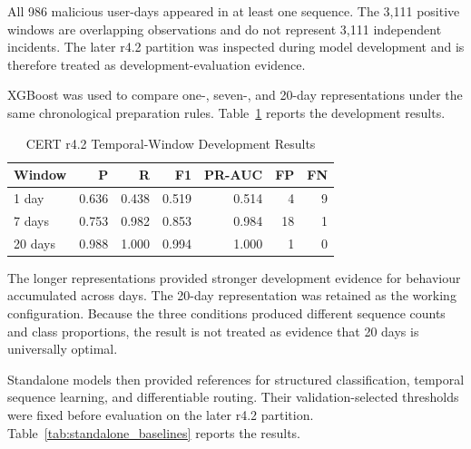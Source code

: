 All 986 malicious user-days appeared in at least one sequence. The 3,111
positive windows are overlapping observations and do not represent 3,111
independent incidents. The later r4.2 partition was inspected during model
development and is therefore treated as development-evaluation evidence.

\smallskip
XGBoost was used to compare one-, seven-, and 20-day representations under
the same chronological preparation rules.
Table~\ref{tab:temporal_window_comparison} reports the development results.

\begin{table}[!tbp]
\caption{CERT r4.2 Temporal-Window Development Results}
\label{tab:temporal_window_comparison}
\centering
\footnotesize
\renewcommand{\arraystretch}{1.08}
\setlength{\tabcolsep}{1.5pt}
\begin{tabular*}{\columnwidth}
{@{\extracolsep{\fill}}lrrrrrr@{}}
\hline
\textbf{Window} &
\textbf{P} &
\textbf{R} &
\textbf{F1} &
\textbf{PR-AUC} &
\textbf{FP} &
\textbf{FN} \\
\hline
1 day & 0.636 & 0.438 & 0.519 & 0.514 & 4 & 9 \\
7 days & 0.753 & 0.982 & 0.853 & 0.984 & 18 & 1 \\
20 days & 0.988 & 1.000 & 0.994 & 1.000 & 1 & 0 \\
\hline
\end{tabular*}
\end{table}

The longer representations provided stronger development evidence for
behaviour accumulated across days. The 20-day representation was retained
as the working configuration. Because the three conditions produced
different sequence counts and class proportions, the result is not treated
as evidence that 20 days is universally optimal.

\smallskip
Standalone models then provided references for structured classification,
temporal sequence learning, and differentiable routing. Their
validation-selected thresholds were fixed before evaluation on the later
r4.2 partition. Table~\ref{tab:standalone_baselines} reports the results.

